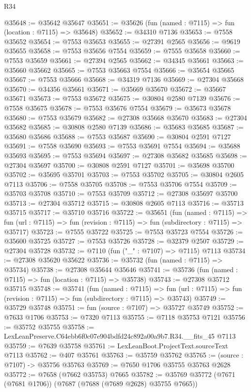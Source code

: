 \begin{lexlean}{R34}
\begin{coremodule}
@35648 := @35642 @35647
@35651 := @35626 (fun (named : @7115) => fun (location : @7115) => @35648)
@35652 := @34310 @7136
@35653 := @7558 @35652
@35654 := @7553 @35653
@35655 := @27391 @2565
@35656 := @9619 @35655
@35658 := @7553 @35656 @7554
@35659 := @7555 @35658
@35660 := @7553 @35659
@35661 := @27394 @2565
@35662 := @34345 @35661
@35663 := @35660 @35662
@35665 := @7553 @35663 @7554
@35666 := @35654 @35665
@35667 := @7553 @35666
@35668 := @34319 @7136
@35669 := @27304 @35668
@35670 := @34356 @35661
@35671 := @35669 @35670
@35672 := @35667 @35671
@35673 := @7553 @35672
@35675 := @30804 @2580 @7139
@35676 := @7558 @35675
@35678 := @7553 @35676 @7554
@35679 := @35673 @35678
@35680 := @7553 @35679
@35682 := @27308 @35668 @35670
@35683 := @27304 @35682
@35685 := @30808 @2580 @7139
@35686 := @35683 @35685
@35687 := @35680 @35686
@35688 := @7553 @35687
@35690 := @30804 @2591 @7127
@35691 := @7558 @35690
@35693 := @7553 @35691 @7554
@35694 := @35688 @35693
@35695 := @7553 @35694
@35697 := @27308 @35682 @35685
@35698 := @27304 @35697
@35700 := @30808 @2591 @7127
@35701 := @35698 @35700
@35702 := @35695 @35701
@35703 := @7553 @35702
@35705 := @30804 @2605 @7113
@35706 := @7558 @35705
@35708 := @7553 @35706 @7554
@35709 := @35703 @35708
@35710 := @7553 @35709
@35712 := @27308 @35697 @35700
@35713 := @27304 @35712
@35715 := @30808 @2605 @7113
@35716 := @35713 @35715
@35717 := @35710 @35716
@35722 := @35651
    (fun (named : @7115) =>
    fun (url : @7115) => fun (revision : @7115) => fun (subdirectory : @7115) => @35717)
@35723 := @7555 @35722
@35725 := @7553 @35723 @7554
@35726 := @35600 @35725
@35727 := @7553 @35726
@35728 := @32379 @2507
@35729 := @27304 @35728
@35732 := @7110 (fun ("_" : @7107) => @7115) @7113
@35734 := @27308 @35620 @35622
@35736 := @35732 (fun (named : @7115) => @35734)
@35738 := @27308 @35644 @35646
@35741 := @35736 (fun (named : @7115) => fun (location : @7115) => @35738)
@35743 := @27308 @35712 @35715
@35748 := @35741
    (fun (named : @7115) =>
    fun (url : @7115) => fun (revision : @7115) => fun (subdirectory : @7115) => @35743)
@35749 := @35729 @35748
@35751 := fun (source : @7107) => @35727 @35749
@35752 := @7633 @1706
@35753 := @7320 @7113
@35755 := @7118 @35753 @7121
@35756 := @35752 @35755
@35758 := LexLeanPreserve.C64ebb6f0c07e904bdfd24c892a00a9b7.R34.__fits_45 @7113
@35759 := @7639 @35758
@35761 := LexLeanBoot.ProjectText.sourceText @7113
@35762 := @407 @35761
@35763 := @35759 @35762
@35765 := (source : @7107) -> @35756 @35763
@35769 := @7650 @1706 @35755 @35763 @2628
@35772 := @7658 (@7662 @35753) @7665
@35782 := @35769 @35772 (@7671 (@7681 @1706)) (@7687 (@7688 (@7689 @2628) @35755 @7665))

\end{coremodule}
\end{lexlean}
